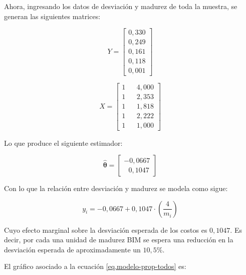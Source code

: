 Ahora, ingresando los datos de desviación y madurez de toda la muestra, se generan las siguientes matrices:

\begin{minipage}{.45\linewidth}
    \begin{equation*}
    Y = 
        \begin{bmatrix}
            0,330 \\
            0,249 \\
            0,161 \\
            0,118 \\
            0,001 
        \end{bmatrix}
    \end{equation*}
\end{minipage}
\begin{minipage}{.45\linewidth}
    \begin{equation*}
    X = 
        \begin{bmatrix}
            1 & & 4,000 \\
            1 & & 2,353 \\
            1 & & 1,818 \\
            1 & & 2,222 \\
            1 & & 1,000
        \end{bmatrix}
    \end{equation*}
\end{minipage}

Lo que produce el siguiente estimador:

\begin{equation}
    \hat{\bm{\theta}} = 
        \begin{bmatrix}
            -0,0667 \\
            ~~~0,1047
        \end{bmatrix}
\end{equation}

Con lo que la relación entre desviación y madurez se modela como sigue:

\begin{equation}
    \label{eq.modelo-prop-todos}
    y_i = -0,0667 + 0,1047\cdot \left( \frac{4}{m_i} \right)
\end{equation}

Cuyo efecto marginal sobre la desviación esperada de los costos es $0,1047$. Es decir, por cada una unidad de madurez BIM se espera una reducción en la desviación esperada de aproximadamente un $10,5\%$.

El gráfico asociado a la ecuación \eqref{eq.modelo-prop-todos} es:

